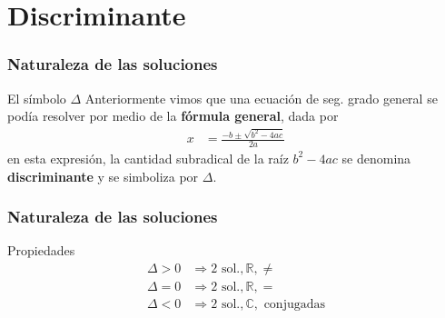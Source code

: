 \documentclass[12pt,spanish,x11names]{beamer}
\title{\talktitle}
\subtitle{\talksubtitle}
\author{\talkauthor}
\institute{\talkaffiliation}
\date{\footnotesize{\emph{\href{\talkblog}{\talkemail}}}}
\def\RR{\mathbb{R}}
\def\CC{\mathbb{C}}
\begin{document}
\begin{frame}
\titlepage
\end{frame}
\section{Discriminante}
\begin{frame}
  \frametitle{Naturaleza de las soluciones}
  \begin{block}{El símbolo $\Delta$}
    Anteriormente vimos que una ecuación de seg. grado general se podía resolver
    por medio de la \textbf{fórmula general}, dada por
    \begin{align*}
      x&=\frac{-b\pm\sqrt{b^2-4ac}}{2a}
    \end{align*}
    en esta expresión, la cantidad subradical de la raíz $b^2-4ac$ se denomina
    \textbf{discriminante} y se simboliza por $\Delta$.
  \end{block}
\end{frame}
\begin{frame}
  \frametitle{Naturaleza de las soluciones}
  \begin{block}{Propiedades}
    \begin{align*}
    \Delta>0&\Rightarrow 2\text{ sol.},\RR,\neq\\
    \Delta=0&\Rightarrow 2\text{ sol.},\RR,=\\
    \Delta<0&\Rightarrow 2\text{ sol.},\CC,\text{ conjugadas}
    \end{align*}
  \end{block}
\end{frame}
\end{document}
